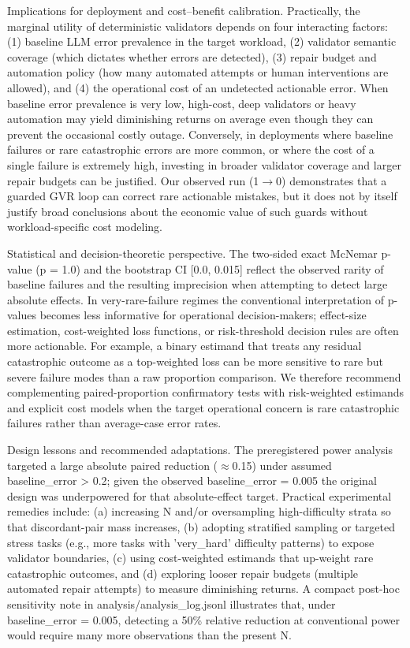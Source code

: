 \documentclass[conference]{IEEEtran}
\begin{document}
Implications for deployment and cost--benefit calibration. Practically, the marginal utility of deterministic validators depends on four interacting factors: (1) baseline LLM error prevalence in the target workload, (2) validator semantic coverage (which dictates whether errors are detected), (3) repair budget and automation policy (how many automated attempts or human interventions are allowed), and (4) the operational cost of an undetected actionable error. When baseline error prevalence is very low, high-cost, deep validators or heavy automation may yield diminishing returns on average even though they can prevent the occasional costly outage. Conversely, in deployments where baseline failures or rare catastrophic errors are more common, or where the cost of a single failure is extremely high, investing in broader validator coverage and larger repair budgets can be justified. Our observed run (1\ensuremath{\rightarrow}0) demonstrates that a guarded GVR loop can correct rare actionable mistakes, but it does not by itself justify broad conclusions about the economic value of such guards without workload-specific cost modeling.

Statistical and decision-theoretic perspective. The two-sided exact McNemar p-value (p = 1.0) and the bootstrap CI [0.0, 0.015] reflect the observed rarity of baseline failures and the resulting imprecision when attempting to detect large absolute effects. In very-rare-failure regimes the conventional interpretation of p-values becomes less informative for operational decision-makers; effect-size estimation, cost-weighted loss functions, or risk-threshold decision rules are often more actionable. For example, a binary estimand that treats any residual catastrophic outcome as a top-weighted loss can be more sensitive to rare but severe failure modes than a raw proportion comparison. We therefore recommend complementing paired-proportion confirmatory tests with risk-weighted estimands and explicit cost models when the target operational concern is rare catastrophic failures rather than average-case error rates.

Design lessons and recommended adaptations. The preregistered power analysis targeted a large absolute paired reduction (\ensuremath{\approx}0.15) under assumed baseline\_error > 0.2; given the observed baseline\_error = 0.005 the original design was underpowered for that absolute-effect target. Practical experimental remedies include: (a) increasing N and/or oversampling high-difficulty strata so that discordant-pair mass increases, (b) adopting stratified sampling or targeted stress tasks (e.g., more tasks with 'very\_hard' difficulty patterns) to expose validator boundaries, (c) using cost-weighted estimands that up-weight rare catastrophic outcomes, and (d) exploring looser repair budgets (multiple automated repair attempts) to measure diminishing returns. A compact post-hoc sensitivity note in analysis/analysis\_log.jsonl illustrates that, under baseline\_error = 0.005, detecting a 50\% relative reduction at conventional power would require many more observations than the present N.
\end{document}
